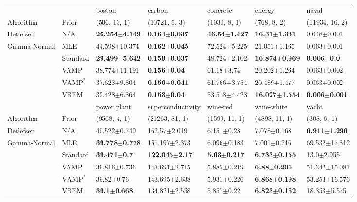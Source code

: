 \begin{tabular}{lllllll}
\toprule
             &      &                     boston &                    carbon &                  concrete &                     energy &                     naval \\
Algorithm & Prior& (506, 13, 1)& (10721, 5, 3)& (1030, 8, 1)& (768, 8, 2)& (11934, 16, 2)\\
\midrule
Detlefsen & N/A &  \textbf{26.254$\pm$4.149} &  \textbf{0.164$\pm$0.037} &  \textbf{46.54$\pm$1.427} &   \textbf{16.31$\pm$1.331} &           0.048$\pm$0.001 \\
Gamma-Normal & MLE &          44.598$\pm$10.374 &  \textbf{0.162$\pm$0.045} &          72.524$\pm$5.225 &           21.051$\pm$1.165 &           0.063$\pm$0.001 \\
             & Standard &  \textbf{29.499$\pm$5.642} &  \textbf{0.159$\pm$0.037} &          48.724$\pm$2.102 &  \textbf{16.874$\pm$0.969} &    \textbf{0.006$\pm$0.0} \\
             & VAMP &          38.774$\pm$11.191 &   \textbf{0.156$\pm$0.04} &            61.18$\pm$3.74 &           20.202$\pm$1.264 &           0.063$\pm$0.002 \\
             & $\text{VAMP}^*$ &           37.623$\pm$9.804 &  \textbf{0.156$\pm$0.041} &          61.766$\pm$3.754 &           20.489$\pm$1.477 &           0.063$\pm$0.002 \\
             & VBEM &           32.428$\pm$6.864 &   \textbf{0.153$\pm$0.04} &          53.518$\pm$4.423 &  \textbf{16.027$\pm$1.554} &  \textbf{0.006$\pm$0.001} \\
\midrule
             &      &                power plant &          superconductivity &                 wine-red &                wine-white &                     yacht \\
Algorithm & Prior& (9568, 4, 1)& (21263, 81, 1)& (1599, 11, 1)& (4898, 11, 1)& (308, 6, 1)\\
\midrule
Detlefsen & N/A &           40.522$\pm$0.749 &           162.57$\pm$2.019 &           6.151$\pm$0.23 &           7.078$\pm$0.168 &  \textbf{6.911$\pm$1.296} \\
Gamma-Normal & MLE &  \textbf{39.778$\pm$0.778} &          151.197$\pm$2.373 &          6.096$\pm$0.183 &           7.001$\pm$0.216 &         69.532$\pm$17.812 \\
             & Standard &    \textbf{39.471$\pm$0.7} &  \textbf{122.045$\pm$2.17} &  \textbf{5.63$\pm$0.217} &  \textbf{6.733$\pm$0.155} &            13.0$\pm$2.955 \\
             & VAMP &           39.816$\pm$0.736 &          143.691$\pm$2.715 &          5.885$\pm$0.219 &   \textbf{6.88$\pm$0.206} &         51.342$\pm$15.081 \\
             & $\text{VAMP}^*$ &             39.82$\pm$0.76 &          143.695$\pm$2.638 &          5.931$\pm$0.226 &  \textbf{6.868$\pm$0.198} &         53.253$\pm$16.576 \\
             & VBEM &    \textbf{39.1$\pm$0.668} &          134.821$\pm$2.558 &           5.857$\pm$0.22 &  \textbf{6.823$\pm$0.162} &          18.353$\pm$5.575 \\
\bottomrule
\end{tabular}

